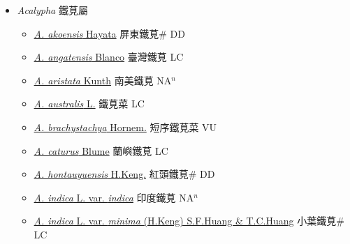
  \begin{itemize}
 \item[] \textit{Acalypha} 鐵莧屬
                    
  \begin{itemize}
        \item[] \href{http://www.theplantlist.org/tpl1.1/search?q=Acalypha+akoensis}{\textit{A. akoensis} Hayata}   屏東鐵莧\# DD
        \item[] \href{http://www.theplantlist.org/tpl1.1/search?q=Acalypha+angatensis}{\textit{A. angatensis} Blanco}   臺灣鐵莧 LC
        \item[] \href{http://www.theplantlist.org/tpl1.1/search?q=Acalypha+aristata}{\textit{A. aristata} Kunth}   南美鐵莧 NA$^n$
        \item[] \href{http://www.theplantlist.org/tpl1.1/search?q=Acalypha+australis}{\textit{A. australis} L.}   鐵莧菜 LC
        \item[] \href{http://www.theplantlist.org/tpl1.1/search?q=Acalypha+brachystachya}{\textit{A. brachystachya} Hornem.}   短序鐵莧菜 VU
        \item[] \href{http://www.theplantlist.org/tpl1.1/search?q=Acalypha+caturus}{\textit{A. caturus} Blume}   蘭嶼鐵莧 LC
        \item[] \href{http://www.theplantlist.org/tpl1.1/search?q=Acalypha+hontauyuensis}{\textit{A. hontauyuensis} H.Keng.}   紅頭鐵莧\# DD
        \item[] \href{http://www.theplantlist.org/tpl1.1/search?q=Acalypha+indica+var.+indica}{\textit{A. indica} L. var. \textit{indica}}   印度鐵莧 NA$^n$
        \item[] \href{http://www.theplantlist.org/tpl1.1/search?q=Acalypha+indica+var.+minima}{\textit{A. indica} L. var. \textit{minima} (H.Keng) S.F.Huang \& T.C.Huang}   小葉鐵莧\# LC

\end{itemize}
\end{itemize}

